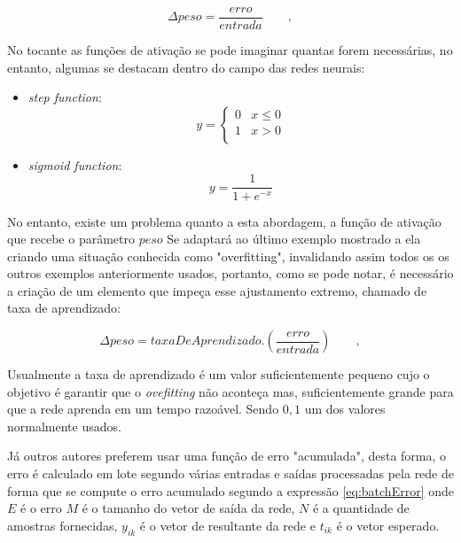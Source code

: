 \begin{apendicesenv}
		\begin{equation}
			\Delta peso = \dfrac{erro} { entrada} \qquad,
		\end{equation}
	
		\par No tocante as funções de ativação se pode imaginar quantas forem necessárias, no entanto, algumas se destacam dentro do campo das redes neurais:
	
		\begin{itemize}
			\item \textit{step function}: \begin{equation}
				y = \begin{cases} 
					0 & x\leq 0 \\
					1 & x > 0 \\
				\end{cases}
			\end{equation}
			\item \textit{sigmoid function}: \begin{equation}
				y = \dfrac{1}{1 + e^{-x}}
			\end{equation}
		\end{itemize}
	
		\par No entanto, existe um problema quanto a esta abordagem, a função de ativação que recebe o parâmetro $peso$ Se adaptará ao último exemplo mostrado a ela criando uma situação conhecida como "overfitting", invalidando assim todos os os outros exemplos anteriormente usados, portanto, como se pode notar, é necessário a criação de um elemento que impeça esse ajustamento extremo, chamado de taxa de aprendizado:
		
		\begin{equation}
			\Delta peso = taxaDeAprendizado . \left( \dfrac{erro} { entrada} \right) \qquad,
		\end{equation}
			
		\par Usualmente a taxa de aprendizado é um valor suficientemente pequeno cujo o objetivo é garantir que o \textit{ovefitting} não aconteça mas, suficientemente grande para que a rede aprenda em um tempo razoável. Sendo $0,1$ um dos valores normalmente usados.
		
		
		\par Já outros autores preferem usar uma função de erro "acumulada", desta forma, o erro é calculado em lote segundo várias entradas e saídas processadas pela rede de forma que se compute o erro acumulado segundo a expressão \ref{eq:batchError} onde $E$ é o erro $M$ é o tamanho do vetor de saída da rede, $N$ é a quantidade de amostras fornecidas, $y_{ik}$ é o vetor de resultante da rede e $t_{ik}$ é o vetor esperado.
		

\end{apendicesenv}
